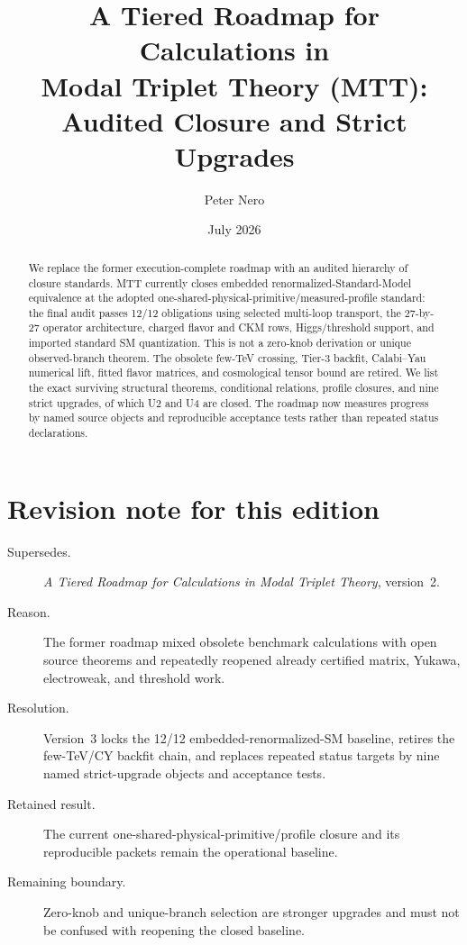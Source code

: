 \documentclass[11pt]{article}
\title{A Tiered Roadmap for Calculations in\\Modal Triplet Theory (MTT): Audited Closure and Strict Upgrades}
\author{Peter Nero}
\date{July 2026}
\begin{document}
\maketitle

\begin{abstract}
We replace the former execution-complete roadmap with an audited hierarchy of
closure standards. MTT currently closes embedded renormalized-Standard-Model
equivalence at the adopted one-shared-physical-primitive/measured-profile
standard: the final audit passes 12/12 obligations using selected multi-loop
transport, the 27-by-27 operator architecture, charged flavor and CKM rows,
Higgs/threshold support, and imported standard SM quantization. This is not a
zero-knob derivation or unique observed-branch theorem. The obsolete few-TeV
crossing, Tier-3 backfit, Calabi--Yau numerical lift, fitted flavor matrices,
and cosmological tensor bound are retired. We list the exact surviving
structural theorems, conditional relations, profile closures, and nine strict
upgrades, of which U2 and U4 are closed. The roadmap now measures progress by
named source objects and reproducible acceptance tests rather than repeated
status declarations.
\end{abstract}

\section*{Revision note for this edition}
\begin{description}
\item[Supersedes.] \emph{A Tiered Roadmap for Calculations in Modal Triplet
Theory}, version~2.
\item[Reason.] The former roadmap mixed obsolete benchmark calculations with
open source theorems and repeatedly reopened already certified matrix,
Yukawa, electroweak, and threshold work.
\item[Resolution.] Version~3 locks the 12/12 embedded-renormalized-SM baseline,
retires the few-TeV/CY backfit chain, and replaces repeated status targets by
nine named strict-upgrade objects and acceptance tests.
\item[Retained result.] The current one-shared-physical-primitive/profile
closure and its reproducible packets remain the operational baseline.
\item[Remaining boundary.] Zero-knob and unique-branch selection are stronger
upgrades and must not be confused with reopening the closed baseline.
\end{description}
\end{document}
